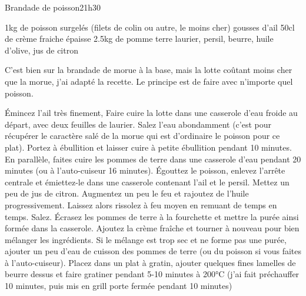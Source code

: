 \begin{recette}{Brandade de poisson}{2}{1h30}{}
\begin{ingredients}
\ingredient 1kg de poisson surgelés (filets de colin ou autre, le moins cher)
 gousses d'ail
\ingredient 50cl de crème fraiche épaisse
\ingredient 2.5kg de pomme terre
\ingredient laurier, persil, beurre, huile d'olive, jus de citron
\end{ingredients}

\begin{remarque}
C'est bien sur la brandade de morue à la base, mais la lotte coûtant moins cher que la morue, j'ai adapté la recette. Le principe est de faire avec n'importe quel poisson.
\end{remarque}


\begin{preparation}
\etape Émincez l'ail très finement, 
\etape Faire cuire la lotte dans une casserole d'eau froide au départ, avec deux feuilles de laurier. Salez l'eau abondamment 
(c'est pour récupérer le caractère salé de la morue qui est d'ordinaire le poisson pour ce plat). Portez à ébullition et laisser 
cuire à petite ébullition pendant 10 minutes.
\etape En parallèle, faites cuire les pommes de terre dans une casserole d'eau pendant 20 minutes (ou à l'auto-cuiseur 16 
minutes).
\etape Égouttez le poisson, enlevez l'arrête centrale et émiettez-le dans une casserole contenant l'ail et le persil. Mettez un peu de jus de citron. Augmentez un peu le feu et rajoutez de l'huile progressivement. Laissez alors rissolez à feu moyen en remuant de temps en temps. Salez.
\etape Écrasez les pommes de terre à la fourchette et mettre la purée ainsi formée dans la casserole.
\etape Ajoutez la crème fraîche et tourner à nouveau pour bien mélanger les ingrédients. Si le mélange est trop sec et ne forme pas une purée, ajouter un peu d'eau de cuisson des pommes de terre (ou du poisson si vous faites à l'auto-cuiseur).
\etape Placez dans un plat à gratin, ajouter quelques fines lamelles de beurre dessus et faire gratiner pendant 5-10 minutes à 
200°C (j'ai fait préchauffer 10 minutes, puis mis en grill porte fermée pendant 10 minutes)
\end{preparation}

\end{recette}

